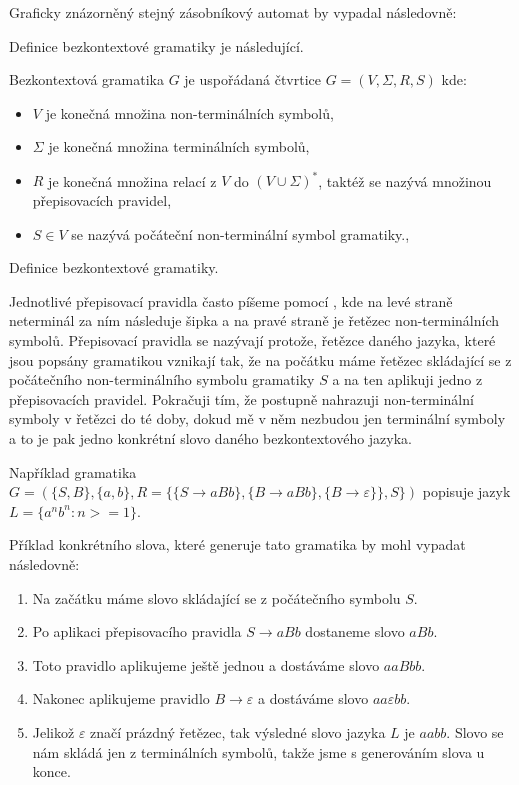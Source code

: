 Graficky znázorněný stejný zásobníkový automat by vypadal následovně:


Definice bezkontextové gramatiky je následující.

\begin{framed}
	Bezkontextová gramatika \( G \) je uspořádaná čtvrtice \( G = (V, \Sigma, R, S) \) kde:
	\begin{itemize}
		\item \( V \) je konečná množina non-terminálních symbolů,
		\item \( \Sigma \) je konečná množina terminálních symbolů,
		\item \( R \) je konečná množina relací z \(V\) do \( (V \cup \Sigma )^* \), taktéž se nazývá množinou přepisovacích pravidel,
		\item \( S \in V\) se nazývá počáteční non-terminální symbol gramatiky.,
	\end{itemize}
\end{framed}
\begin{mydef}
	Definice bezkontextové gramatiky.
\end{mydef}
Jednotlivé přepisovací pravidla často píšeme pomocí , kde na levé straně neterminál za ním následuje šipka a na pravé straně je řetězec non-terminálních symbolů. Přepisovací pravidla se nazývají protože, řetězce daného jazyka, které jsou popsány gramatikou vznikají tak, že na počátku máme řetězec skládající se z počátečního non-terminálního symbolu gramatiky \(S\) a na ten aplikuji jedno z přepisovacích pravidel. Pokračuji tím, že postupně nahrazuji non-terminální symboly v řetězci do té doby, dokud mě v něm nezbudou jen terminální symboly a to je pak jedno konkrétní slovo daného bezkontextového jazyka.

Například gramatika \( G = (\{S, B\}, \{ a, b\}, R = \{\{S \rightarrow aBb\}, \{B \rightarrow aBb\},\{B \rightarrow \varepsilon\}\}, S \}) \) popisuje jazyk \( L = \{ a^n b^n : n >= 1 \}  \).

Příklad konkrétního slova, které generuje tato gramatika by mohl vypadat následovně:
\begin{enumerate}
	\item Na začátku máme slovo skládající se z počátečního symbolu \(S\).
	\item Po aplikaci přepisovacího pravidla \(S \rightarrow aBb\) dostaneme slovo \(aBb\).
	\item Toto pravidlo aplikujeme ještě jednou a dostáváme slovo \(aaBbb\).
	\item Nakonec aplikujeme pravidlo \(B \rightarrow \varepsilon \) a dostáváme slovo \(aa\varepsilon bb\).
	\item Jelikož \(\varepsilon\) značí prázdný řetězec, tak výsledné slovo jazyka \(L\) je \(aabb\). Slovo se nám skládá jen z terminálních symbolů, takže jsme s generováním slova u konce.
\end{enumerate}
\cite{CFG}

